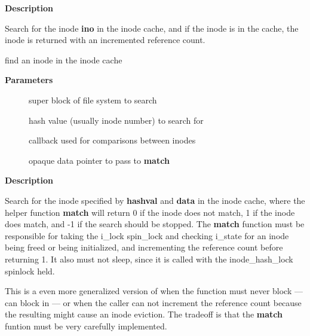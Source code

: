 \documentclass[a4paper,8pt,english]{sphinxmanual}
\begin{document}
\textbf{Description}

Search for the inode \textbf{ino} in the inode cache, and if the inode is in the
cache, the inode is returned with an incremented reference count.

\begin{fulllineitems}
\label{filesystems/index:c.find_inode_nowait}
find an inode in the inode cache

\end{fulllineitems}


\textbf{Parameters}
\begin{description}
\item[{}] \leavevmode
super block of file system to search

\item[{}] \leavevmode
hash value (usually inode number) to search for

\item[{}] \leavevmode
callback used for comparisons between inodes

\item[{}] \leavevmode
opaque data pointer to pass to \textbf{match}

\end{description}

\textbf{Description}

Search for the inode specified by \textbf{hashval} and \textbf{data} in the inode
cache, where the helper function \textbf{match} will return 0 if the inode
does not match, 1 if the inode does match, and -1 if the search
should be stopped.  The \textbf{match} function must be responsible for
taking the i\_lock spin\_lock and checking i\_state for an inode being
freed or being initialized, and incrementing the reference count
before returning 1.  It also must not sleep, since it is called with
the inode\_hash\_lock spinlock held.

This is a even more generalized version of {\hyperref[filesystems/index:c.ilookup5]{\emph{}}} when the
function must never block ---  can block in
 --- or when the caller can not increment
the reference count because the resulting {\hyperref[filesystems/index:c.iput]{\emph{}}} might cause an
inode eviction.  The tradeoff is that the \textbf{match} funtion must be
very carefully implemented.
\end{document}
